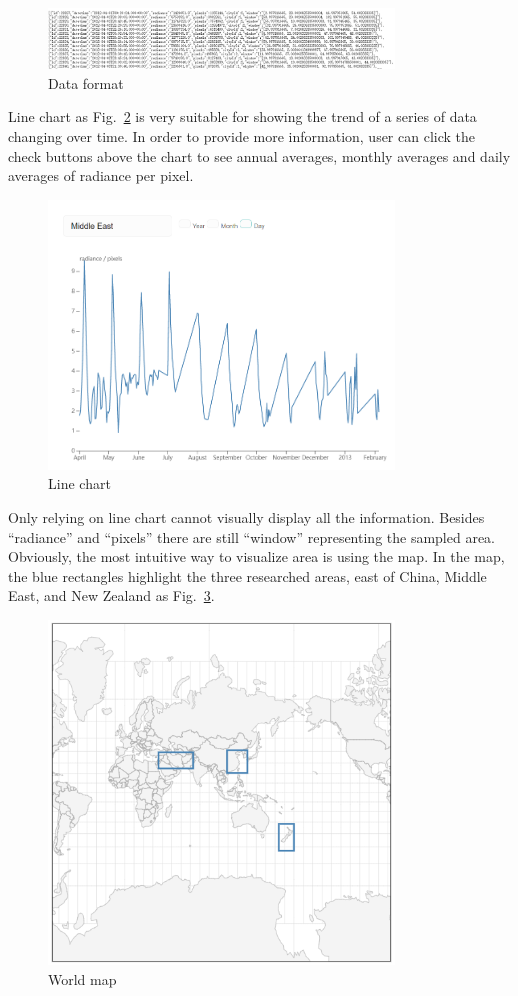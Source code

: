\documentclass[conference]{IEEEtran}
\begin{document}
\begin{figure}[htbp]
    \centerline{\includegraphics[width=260pt]{images/Data_format_frontend_get.png}}
    \caption{Data format}
    \label{dffg}
\end{figure}
 
Line chart as Fig.~\ref{lchart} is very suitable for showing the trend of a series of data changing over time. In order to provide more 
information, user can click the check buttons above the chart to see annual averages, monthly averages and daily averages of radiance 
per pixel.  

\begin{figure}[htbp]
    \centerline{\includegraphics[width=260pt]{images/Line_chart.png}}
    \caption{Line chart}
    \label{lchart}
\end{figure}

Only relying on line chart cannot visually display all the information. Besides “radiance” and “pixels” there are still “window” representing the sampled area. Obviously, the most intuitive way to visualize area is using the map. In the map, the blue rectangles highlight the three researched areas, east of China, Middle East, and New Zealand as Fig.~\ref{wmap}.

\begin{figure}[htbp]
    \centerline{\includegraphics[width=260pt]{images/Worldmap.png}}
    \caption{World map}
    \label{wmap}
\end{figure}
\end{document}
